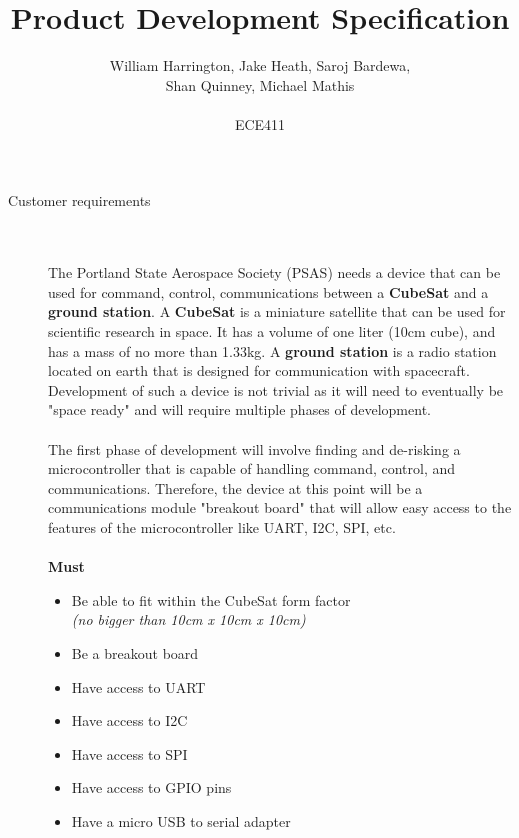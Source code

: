 \documentclass[12pt]{article}
\begin{document}
\title{Product Development Specification}%
\author{William Harrington, Jake Heath, Saroj Bardewa,\\ Shan Quinney, Michael Mathis\\ \\ %
ECE411} %

\maketitle
 \small
\begin{description}
	\item[Customer requirements] \hfill \\ \\
		The Portland State Aerospace Society (PSAS) needs a device that can be used for command, control, communications between a \textbf{CubeSat} and a \textbf{ground station}.
		A \textbf{CubeSat} is a miniature satellite that can be used for scientific research in space. It has a volume of one liter (10cm cube), and has a mass of no more than 1.33kg.
		A \textbf{ground station} is a radio station located on earth that is designed for communication with spacecraft.
		Development of such a device is not trivial as it will need to eventually be "space ready" and will require multiple phases of development. \hfill \\ \\
		The first phase of development will involve finding and de-risking a microcontroller that is capable of handling command, control, and communications.
		Therefore, the device at this point will be a communications module "breakout board" that will allow easy access to the features of the microcontroller like UART, I2C, SPI, etc.
		\hfill \\ \\
		\newpage
		\textbf{Must}
		\begin{itemize}
			\item{Be able to fit within the CubeSat form factor\\ \textit{(no bigger than 10cm x 10cm x 10cm)}}
			\item{Be a breakout board}
			\item{Have access to UART}
			\item{Have access to I2C}
			\item{Have access to SPI}
			\item{Have access to GPIO pins}
			\item{Have a micro USB to serial adapter}

\end{itemize}
\end{description}
\end{document}
